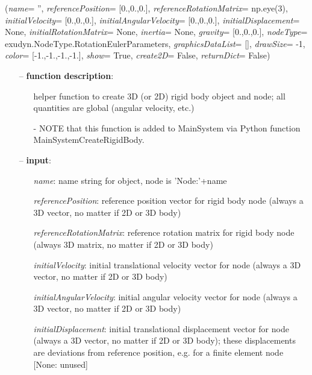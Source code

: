 %
\begin{flushleft}
\label{sec:mainsystemextensions:CreateRigidBody}
({\it name}= '', {\it referencePosition}= [0.,0.,0.], {\it referenceRotationMatrix}= np.eye(3), {\it initialVelocity}= [0.,0.,0.], {\it initialAngularVelocity}= [0.,0.,0.], {\it initialDisplacement}= None, {\it initialRotationMatrix}= None, {\it inertia}= None, {\it gravity}= [0.,0.,0.], {\it nodeType}= exudyn.NodeType.RotationEulerParameters, {\it graphicsDataList}= [], {\it drawSize}= -1, {\it color}= [-1.,-1.,-1.,-1.], {\it show}= True, {\it create2D}= False, {\it returnDict}= False)
\end{flushleft}
\setlength{\itemindent}{0.7cm}
\begin{itemize}[leftmargin=0.7cm]
\item[--]
{\bf function description}: \vspace{-6pt}
\begin{itemize}[leftmargin=1.2cm]
\setlength{\itemindent}{-0.7cm}
\item[]helper function to create 3D (or 2D) rigid body object and node; all quantities are global (angular velocity, etc.)
\item[]- NOTE that this function is added to MainSystem via Python function MainSystemCreateRigidBody.
\end{itemize}
\item[--]
{\bf input}: \vspace{-6pt}
\begin{itemize}[leftmargin=1.2cm]
\setlength{\itemindent}{-0.7cm}
\item[]{\it name}: name string for object, node is 'Node:'+name
\item[]{\it referencePosition}: reference position vector for rigid body node (always a 3D vector, no matter if 2D or 3D body)
\item[]{\it referenceRotationMatrix}: reference rotation matrix for rigid body node (always 3D matrix, no matter if 2D or 3D body)
\item[]{\it initialVelocity}: initial translational velocity vector for node (always a 3D vector, no matter if 2D or 3D body)
\item[]{\it initialAngularVelocity}: initial angular velocity vector for node (always a 3D vector, no matter if 2D or 3D body)
\item[]{\it initialDisplacement}: initial translational displacement vector for node (always a 3D vector, no matter if 2D or 3D body); these displacements are deviations from reference position, e.g. for a finite element node [None: unused]

\end{itemize}
\end{itemize}
